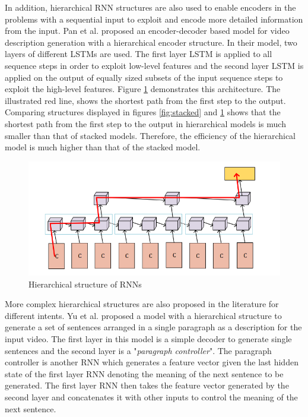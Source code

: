 \documentclass[preprint, 12pt]{elsarticle}
\begin{document}
		In addition, hierarchical RNN structures are also used to enable encoders in the problems with a sequential input to exploit and encode more detailed information from the input. Pan et al. \cite{pan2016hierarchical} proposed an encoder-decoder based model for video description generation with a hierarchical encoder structure. In their model, two layers of different LSTMs are used. The first layer LSTM is applied to all sequence steps in order to exploit low-level features and the second layer LSTM is applied on the output of equally sized subsets of the input sequence steps to exploit the high-level features. Figure \ref{fig:hrne} demonstrates this architecture. The illustrated red line, shows the shortest path from the first step to the output. Comparing structures displayed in figures \ref{fig:stacked} and \ref{fig:hrne} shows that the shortest path from the first step to the output in hierarchical models is much smaller than that of stacked models. Therefore, the efficiency of the hierarchical model is much higher than that of the stacked model.
				\begin{figure}[H]
			\centering
			\includegraphics[scale=0.5]{Imgs/hrne.png}
			\caption{Hierarchical structure of RNNs \cite{pan2016hierarchical}}
			\label{fig:hrne}
		\end{figure}
		More complex hierarchical structures are also proposed in the literature for different intents. Yu et al.\cite{yu2016video} proposed a model with a hierarchical structure to generate a set of sentences arranged in a single paragraph as a description for the input video. The first layer in this model is a simple decoder to generate single sentences and the second layer is a "\textit{paragraph controller}". The paragraph controller is another RNN which generates a feature vector given the last hidden state of the first layer RNN denoting the meaning of the next sentence to be generated. The first layer RNN then takes the feature vector generated by the second layer and concatenates it with other inputs to control the meaning of the next sentence.
				
\end{document}
